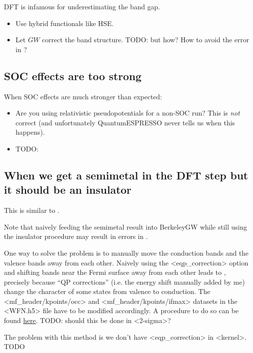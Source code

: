 \documentclass[hyperref, a4paper]{report}
\def\texttt#1{<#1>}%
\newcommand{\shortcode}[1]{\texttt{#1}}
\begin{document}
DFT is infamous for underestimating the band gap.

\begin{itemize}
    \item Use hybrid functionals like HSE.
    \item Let $GW$ correct the band structure. TODO: but how? How to avoid the error in ?
\end{itemize}

\subsection{SOC effects are too strong}

When SOC effects are much stronger than expected: 
\begin{itemize}
    \item Are you using relativistic pseudopotentials for a non-SOC run?
        This is \emph{not} correct 
        (and unfortunately QuantumESPRESSO never tells us when this happens).
    \item TODO: 
\end{itemize}

\subsection{When we get a semimetal in the DFT step but it should be an insulator}\label{sec:unexpected-metal}

This is similar to .

Note that naively feeding the semimetal result into BerkeleyGW 
while still using the insulator procedure
may result in errors in . 

One way to solve the problem is 
to manually move the conduction bands and the valence bands away from each other.
Naively using the \shortcode{eqp_correction} option 
and shifting bands near the Fermi surface away from each other 
leads to ,
precisely because 
``QP corrections'' (i.e. the energy shift manually added by me) 
change the character of some states from valence to conduction.
The \shortcode{mf_header/kpoints/occ} and \shortcode{mf_header/kpoints/ifmax} datasets 
in the \shortcode{WFN.h5} file 
have to be modified accordingly.
A procedure to do so can be found \href{./scripts/wfn-editing/move-occupation.jl}{here}.
TODO: should this be done in \shortcode{2-sigma}?

The problem with this method is we don't have \shortcode{eqp_correction} in \shortcode{kernel}. TODO 
\end{document}
